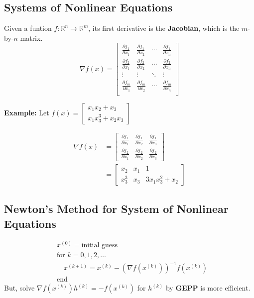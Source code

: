 \documentclass[9pt]{article}
\begin{document}
\begin{multicols}{3}
\hdashrule{\linewidth}{0.5pt}{1mm 1mm}
\vspace{-0.7cm}
\subsection*{Systems of Nonlinear Equations}

Given a funtion $f: \mathbb{R}^n \rightarrow \mathbb{R}^m$, its first derivative is the \textbf{Jacobian}, which is the $m$-by-$n$ matrix.
\[
\nabla f(x) = 
\begin{bmatrix}
\frac{\partial f_1}{\partial x_1} & \frac{\partial f_1}{\partial x_2} & \cdots & \frac{\partial f_1}{\partial x_n}\\
\frac{\partial f_2}{\partial x_1} & \frac{\partial f_2}{\partial x_2} & \cdots & \frac{\partial f_2}{\partial x_n}\\
\vdots & \vdots & \ddots & \vdots\\
\frac{\partial f_m}{\partial x_1} & \frac{\partial f_m}{\partial x_2} & \cdots & \frac{\partial f_m}{\partial x_n}\\
\end{bmatrix}
\]

\hdashrule{\linewidth}{0.5pt}{0.2mm 1mm}

\textbf{Example: }
Let $
f(x) = 
\begin{bmatrix}
    x_1x_2 + x_3\\
    x_1x_3^3 + x_2x_3
\end{bmatrix}
$

\[
\begin{aligned}
\nabla f(x) &= 
\begin{bmatrix}
\frac{\partial f_1}{\partial x_1} & \frac{\partial f_1}{\partial x_2}  & \frac{\partial f_1}{\partial x_3}\\
\frac{\partial f_2}{\partial x_1} & \frac{\partial f_2}{\partial x_2} & \frac{\partial f_2}{\partial x_3}
\end{bmatrix}\\
&=
\begin{bmatrix}
    x_2 & x_1 & 1\\
    x_3^3 & x_3 & 3x_1x_3^2 + x_2
\end{bmatrix}
\end{aligned}
\]

\subsection*{Newton's Method for System of Nonlinear Equations}
\[
\boxed{
\begin{aligned}
    &x^{(0)} = \text{initial guess}\\
    &\text{for } k = 0, 1, 2, \ldots \\
    & \quad x^{(k+1)} = x^{(k)} - \left( \nabla f(x^{(k)}) \right)^{-1}f(x^{(k)})\\
    &\text{end}
\end{aligned}
}
\]
But, solve $\nabla f(x^{(k)})h^{(k)} = -f(x^{(k)})$ for $h^{(k)}$ by \textbf{GEPP} is more efficient.




\end{multicols}
\end{document}
